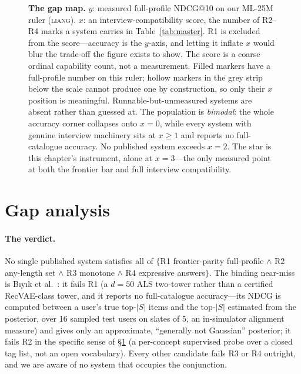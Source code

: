 \documentclass[11pt]{article}
\begin{document}
\begin{figure}[t]
\caption{\textbf{The gap map.} $y$: measured full-profile NDCG@10 on our ML-25M ruler (\textsc{liang}).
$x$: an interview-compatibility score, the number of R2--R4 marks a system carries in
Table~\ref{tab:master}. R1 is excluded from the score---accuracy is the $y$-axis, and letting it inflate $x$
would blur the trade-off the figure exists to show. The score is a coarse ordinal capability count, not a
measurement. Filled markers have a full-profile number on this ruler; hollow markers in the grey strip below
the scale cannot produce one by construction, so only their $x$ position is meaningful. Runnable-but-unmeasured
systems are absent rather than guessed at. The population is \emph{bimodal}: the whole accuracy corner
collapses onto $x{=}0$, while every system with genuine interview machinery sits at $x\ge1$ and reports no
full-catalogue accuracy. No published system exceeds $x{=}2$. The star is this chapter's instrument, alone
at $x{=}3$---the only measured point at both the frontier bar and full interview compatibility.}
\label{fig:gapmap}
\end{figure}

\section{Gap analysis}\label{sec:gap}

\paragraph{The verdict.}
No single published system satisfies all of $\{$R1 frontier-parity full-profile $\wedge$ R2 any-length set $\wedge$
R3 monotone $\wedge$ R4 expressive answers$\}$. The binding
near-miss is B\i y\i k et al.~\cite{biyik2023soft}: it fails R1 (a $d{=}50$ ALS two-tower rather than a
certified RecVAE-class tower, and it reports no full-catalogue accuracy---its NDCG is computed between a user's true
top-$|S|$ items and the top-$|S|$ estimated from the posterior, over 16 sampled test users on slates of 5, an
in-simulator alignment measure) and gives only an approximate, ``generally not Gaussian'' posterior; it fails R2 in
the specific sense of \S\ref{sec:gap} (a per-concept supervised probe over a closed tag list, not an open
vocabulary). Every other candidate fails R3 or R4 outright, and we are aware of no system that occupies the
conjunction.
\end{document}
